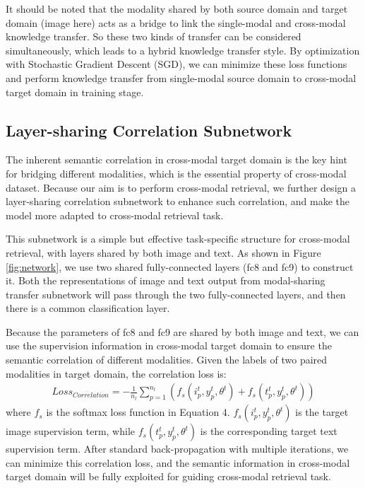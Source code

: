 \documentclass{article}
\begin{document}
It should be noted that the modality shared by both source domain and target domain (image here) acts as a bridge to link the single-modal and cross-modal knowledge transfer. So these two kinds of transfer can be considered simultaneously, which leads to a hybrid knowledge transfer style. 
By optimization with Stochastic Gradient Descent (SGD), we can minimize these loss functions and perform knowledge transfer from single-modal source domain to cross-modal target domain in training stage. 

\subsection{Layer-sharing Correlation Subnetwork}

The inherent semantic correlation in cross-modal target domain is the key hint for bridging different modalities, which is the essential property of cross-modal dataset. Because our aim is to perform cross-modal retrieval, we further design a layer-sharing correlation subnetwork to enhance such correlation, and make the model more adapted to cross-modal retrieval task.

This subnetwork is a simple but effective task-specific structure for cross-modal retrieval, with layers shared by both image and text. 
As shown in Figure \ref{fig:network}, we use two shared fully-connected layers (fc8 and fc9) to construct it. Both the representations of image and text output from  modal-sharing transfer subnetwork will pass through the two fully-connected layers, and then there is a common classification layer.

Because the parameters of fc8 and fc9 are shared by both image and text, we can use the supervision information in cross-modal target domain to ensure the semantic correlation of different modalities. Given the labels of two paired modalities in target domain, the correlation loss is:
\begin{align}
Loss_{Correlation}= -\frac{1}{n_l}\sum_{p=1}^{n_l}( f_s(i_p^t, y_p^t, \theta^t) + f_s(t_p^t, y_p^t, \theta^t))
\end{align}
where $f_s$ is the softmax loss function in Equation 4. $f_s(i_p^t, y_p^t, \theta^t)$ is the target image supervision term, while  $f_s(t_p^t, y_p^t, \theta^t)$ is the corresponding target text supervision term.
After standard back-propagation with multiple iterations, we can minimize this correlation loss, and the semantic information in cross-modal target domain will be fully exploited for guiding cross-modal retrieval task. 
\end{document}
